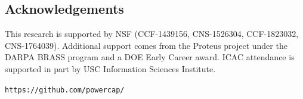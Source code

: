 \documentclass[a0,portrait]{a0poster}
\renewcommand{\small}{\fontsize{24.88}{30}\selectfont}
\begin{document}
\begin{multicols}{2}
\color{DarkSlateGray} %






%


\vspace{-1cm}
\section*{Acknowledgements}

\small
This research is supported by NSF (CCF-1439156, CNS-1526304, CCF-1823032, CNS-1764039).
Additional support comes from the Proteus project under the DARPA BRASS program and a DOE Early Career award.
ICAC attendance is supported in part by USC Information Sciences Institute.


\end{multicols}

\begin{center}
\vspace{0.5cm}
\Large \texttt{https://github.com/powercap/}
\end{center}
\end{document}
